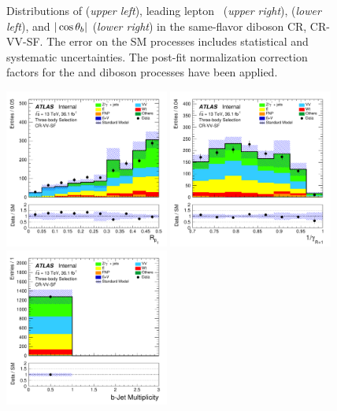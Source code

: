 \begin{figure}[!htb]
\begin{center}
        \caption{
            Distributions of \mdr (\textit{upper left}), leading lepton \pT~(\textit{upper right}),
            \dpb (\textit{lower left}), and $|\cos\theta_b|$ (\textit{lower right}) in the same-flavor diboson CR,
            CR-VV-SF.
            The error on the SM processes includes statistical and systematic uncertainties.
            The post-fit normalization correction factors for the \ttbar and diboson processes
            have been applied.
        }
        \label{fig:crvvSF_0}
    \end{center}
\end{figure}
\begin{figure}[!htb]
    \begin{center}
        \includegraphics[width=0.48\textwidth]{figures/search_stop2l/bkg_est/crvsf/crvSF_RPT}
        \includegraphics[width=0.48\textwidth]{figures/search_stop2l/bkg_est/crvsf/crvSF_gamInvRp1}
        \includegraphics[width=0.48\textwidth]{figures/search_stop2l/bkg_est/crvsf/crvSF_nBJets}

\end{center}
\end{figure}
